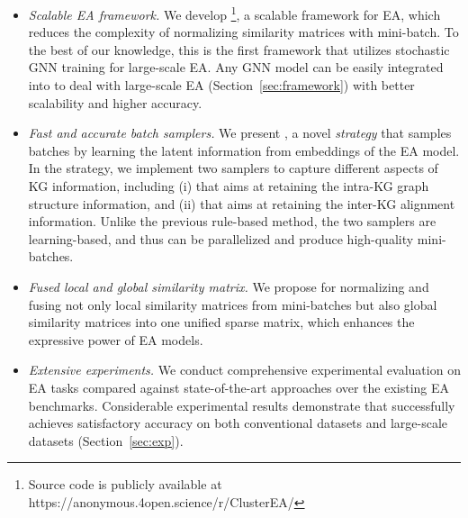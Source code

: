 \begin{itemize}[topsep=0pt,itemsep=0pt,parsep=0pt,partopsep=0pt,leftmargin=*]
    \item{\emph{Scalable EA framework.}}
    We develop \ClusterEA{}\footnote{Source code is publicly available at https://anonymous.4open.science/r/ClusterEA/}, a scalable framework for EA, which reduces the complexity of normalizing similarity matrices with mini-batch. To the best of our knowledge, this is the first framework that utilizes stochastic GNN training for large-scale EA. Any GNN model can be easily integrated into \ClusterEA{} to deal with large-scale EA (Section~\ref{sec:framework}) with better scalability and higher accuracy.
    \item{\emph{Fast and accurate batch samplers.}}
    We present \Sampling{}, a novel \emph{strategy} that samples batches by learning the latent information from embeddings of the EA model. In the strategy, we implement two samplers to capture different aspects of KG information, including
    (i) \MetisGCN{} that aims at retaining the intra-KG graph structure information, and
    (ii) \KMeans{} that aims at retaining the inter-KG alignment information. Unlike the previous rule-based method, the two samplers are learning-based, and thus can be parallelized and produce high-quality mini-batches.
    \item{\emph{Fused local and global similarity matrix.}} We propose \Merging{} for normalizing and fusing not only local similarity matrices from mini-batches but also global similarity matrices into one unified sparse matrix, which enhances the expressive power of EA models.
    \item{\emph{Extensive experiments.}} We conduct comprehensive experimental evaluation on EA tasks compared against state-of-the-art approaches over the existing EA benchmarks. Considerable experimental results demonstrate that  \ClusterEA{} successfully achieves satisfactory accuracy on both conventional datasets and large-scale datasets (Section~\ref{sec:exp}).
\end{itemize}

